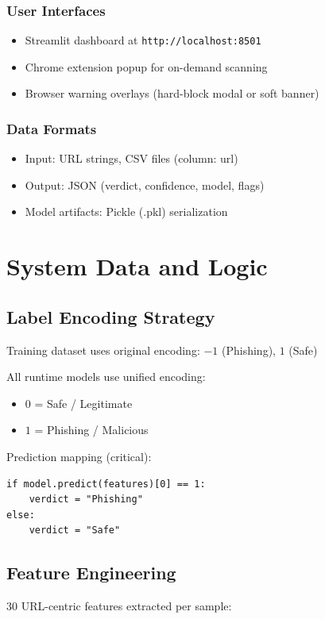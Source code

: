 \documentclass[12pt,a4paper]{report}
\begin{document}
\subsubsection{User Interfaces}
\begin{itemize}[leftmargin=*]
    \item Streamlit dashboard at \texttt{http://localhost:8501}
    \item Chrome extension popup for on-demand scanning
    \item Browser warning overlays (hard-block modal or soft banner)
\end{itemize}

\subsubsection{Data Formats}
\begin{itemize}[leftmargin=*]
    \item Input: URL strings, CSV files (column: url)
    \item Output: JSON (verdict, confidence, model, flags)
    \item Model artifacts: Pickle (.pkl) serialization
\end{itemize}

\section{System Data and Logic}

\subsection{Label Encoding Strategy}
Training dataset uses original encoding: $-1$ (Phishing), $1$ (Safe)

All runtime models use unified encoding:
\begin{itemize}[leftmargin=*]
    \item $0$ = Safe / Legitimate
    \item $1$ = Phishing / Malicious
\end{itemize}

Prediction mapping (critical):
\begin{verbatim}
if model.predict(features)[0] == 1:
    verdict = "Phishing"
else:
    verdict = "Safe"
\end{verbatim}

\subsection{Feature Engineering}
30 URL-centric features extracted per sample:
\end{document}
